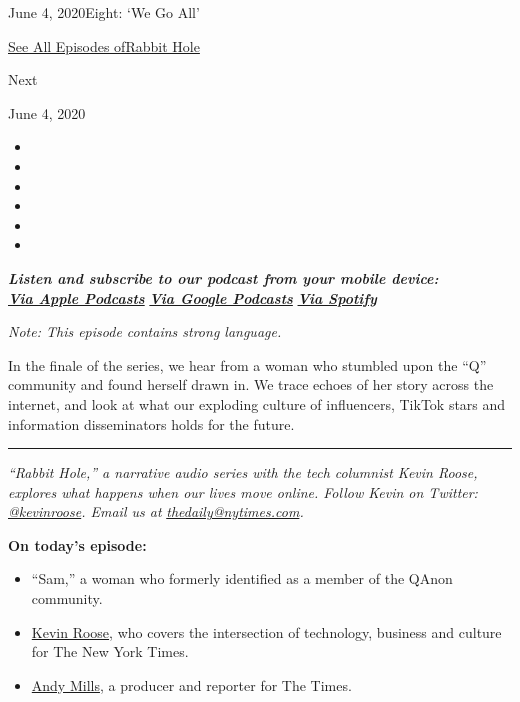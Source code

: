 June 4, 2020Eight: `We Go All'

\href{https://www.nytimes.com/column/rabbit-hole}{See All Episodes
ofRabbit Hole}

Next

June 4, 2020

\begin{itemize}
\item
\item
\item
\item
\item
\item
\end{itemize}

\emph{\textbf{Listen and subscribe to our podcast from your mobile
device:}}\\
\textbf{\href{https://podcasts.apple.com/us/podcast/rabbit-hole/id1507423923}{\emph{Via
Apple Podcasts}}} \emph{\textbf{\textbar{}}}
\textbf{\href{https://podcasts.google.com/?feed=aHR0cHM6Ly9yc3MuYXJ0MTkuY29tL3JhYmJpdC1ob2xl\&ved=0CAAQ4aUDahcKEwiwkaDvsuvoAhUAAAAAHQAAAAAQBQ}{\emph{Via
Google Podcasts}}} \emph{\textbf{\textbar{}}}
\textbf{\href{https://open.spotify.com/show/6dqqC8nkBTC3ldRs7pP4qn?si=kQhpaAqDQ4uWM0RR0-QNkg}{\emph{Via
Spotify}}}

\emph{Note: This episode contains strong language.}

In the finale of the series, we hear from a woman who stumbled upon the
``Q'' community and found herself drawn in. We trace echoes of her story
across the internet, and look at what our exploding culture of
influencers, TikTok stars and information disseminators holds for the
future.

\begin{center}\rule{0.5\linewidth}{\linethickness}\end{center}

\emph{``Rabbit Hole,'' a narrative audio series with the tech columnist
Kevin Roose, explores what happens when our lives move online. Follow
Kevin on Twitter:}
\href{https://twitter.com/kevinroose?ref_src=twsrc\%5Egoogle\%7Ctwcamp\%5Eserp\%7Ctwgr\%5Eauthor}{\emph{@kevinroose}}\emph{.
Email us at}
\href{mailto:thedaily@nytimes.com}{\emph{thedaily@nytimes.com}}\emph{.}

\textbf{On today's episode:}

\begin{itemize}
\item
  ``Sam,'' a woman who formerly identified as a member of the QAnon
  community.
\item
  \href{https://www.nytimes.com/by/kevin-roose}{Kevin Roose}, who covers
  the intersection of technology, business and culture for The New York
  Times.
\item
  \href{https://twitter.com/andymillsnyt?lang=en}{Andy Mills}, a
  producer and reporter for The Times.
\end{itemize}

